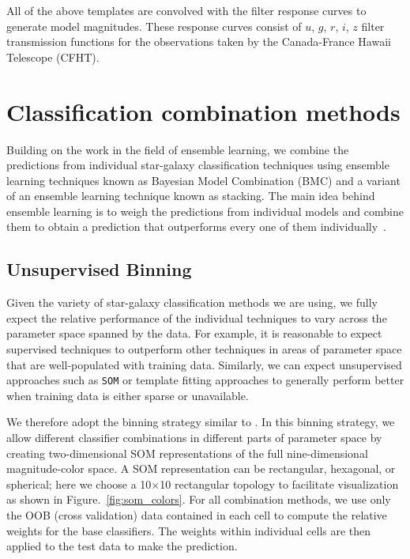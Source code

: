\documentclass[useAMS,usenatbib]{mn2e}
\begin{document}
All of the above templates are convolved
with the filter response curves to generate model magnitudes.
These response curves consist of
$u$, $g$, $r$, $i$, $z$ filter transmission functions
for the observations taken by the
Canada-France Hawaii Telescope (CFHT).


\section{Classification combination methods}
  \label{section:classification_combination_methods}

Building on the work in the field of ensemble learning,
we combine the predictions from
individual star-galaxy classification techniques
using ensemble learning techniques known as
Bayesian Model Combination (BMC)
and a variant of an ensemble learning technique known as stacking.
The main idea behind ensemble learning is to weigh
the predictions from individual models
and combine them to obtain a prediction
that outperforms every one of 
them individually~\citep{rokach2010ensemble}.

\subsection{Unsupervised Binning}
  \label{section:random_atlas}

Given the variety of star-galaxy classification methods
we are using,
we fully expect the relative performance
of the individual techniques to vary across
the parameter space spanned by the data.
For example, it is reasonable to expect 
supervised techniques to outperform other techniques
in areas of parameter space that are well-populated
with training data.
Similarly, we can expect unsupervised approaches
such as \texttt{SOM} or template fitting approaches 
to generally perform better when training data
is either sparse or unavailable.

We therefore adopt the binning strategy similar to 
\cite{carrascokind2014exhausting}.
In this binning strategy,
we allow different classifier combinations 
in different parts of parameter space
by creating two-dimensional SOM representations of
the full nine-dimensional magnitude-color space.
A SOM representation can be rectangular, hexagonal, or spherical;
here we choose a 10$\times$10 rectangular topology to facilitate 
visualization as shown in Figure.~\ref{fig:som_colors}.
For all combination methods,
we use only the OOB (cross validation) data contained in each cell
to compute the relative weights for the base classifiers.
The weights within individual cells are then applied to the test data
to make the prediction.
\end{document}

